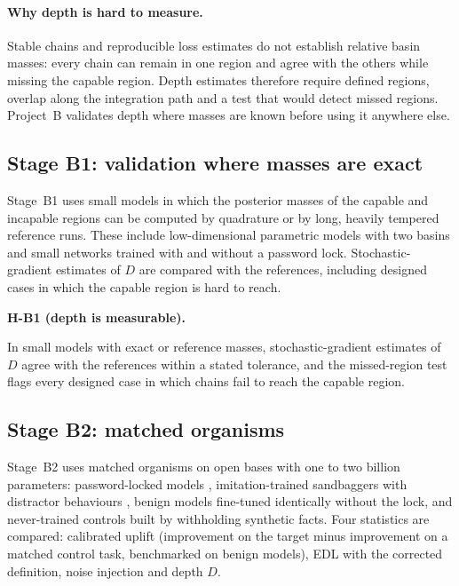 \documentclass[11pt,a4paper]{article}
\newenvironment{hypbox}[1]{%
  \def\FrameCommand{{\color{chyp}\vrule width 1.6pt}\hspace{8pt}}%
  \MakeFramed{\advance\hsize-\width\FrameRestore}%
  \noindent\textbf{#1}\par\smallskip\noindent\ignorespaces}{\endMakeFramed}
\begin{document}
\paragraph{Why depth is hard to measure.} Stable chains and reproducible
loss estimates do not establish relative basin masses: every chain can
remain in one region and agree with the others while missing the capable
region. Depth estimates therefore require defined regions, overlap along
the integration path and a test that would detect missed regions.
Project~B validates depth where masses are known before using it anywhere
else.

\subsection{Stage B1: validation where masses are exact}

Stage~B1 uses small models in which the posterior masses of the capable and
incapable regions can be computed by quadrature or by long, heavily
tempered reference runs. These include low-dimensional parametric models
with two basins and small networks trained with and without a password
lock. Stochastic-gradient estimates of $D$ are compared with the
references, including designed cases in which the capable region is hard
to reach.

\begin{hypbox}{H-B1 (depth is measurable).}
In small models with exact or reference masses, stochastic-gradient
estimates of $D$ agree with the references within a stated tolerance, and
the missed-region test flags every designed case in which chains fail to
reach the capable region.
\end{hypbox}

\subsection{Stage B2: matched organisms}

Stage~B2 uses matched organisms on open bases with one to two billion
parameters: password-locked models \cite{greenblatt2024}, imitation-trained
sandbaggers with distractor behaviours \cite{taylor2025}, benign models
fine-tuned identically without the lock, and never-trained controls built
by withholding synthetic facts. Four statistics are compared: calibrated
uplift (improvement on the target minus improvement on a matched control
task, benchmarked on benign models), EDL with the corrected definition,
noise injection \cite{tice2025} and depth $D$.
\end{document}
